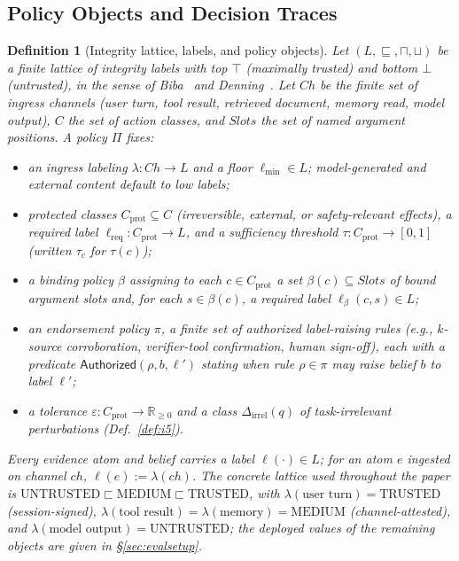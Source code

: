 \documentclass[conference,compsoc]{IEEEtran}
\newtheorem{definition}{Definition}
\theoremstyle{definition}
\theoremstyle{plain}
\providecommand{\tc}{\tau_{c}}
\newcommand{\bindpol}{\ensuremath{\beta}}
\newcommand{\lmin}{\ensuremath{\ell_{\min}}}
\newcommand{\lreq}{\ensuremath{\ell_{\mathrm{req}}}}
\newcommand{\Cprot}{\ensuremath{C_{\mathrm{prot}}}}
\newcommand{\Dirrel}{\ensuremath{\Delta_{\mathrm{irrel}}}}
\begin{document}
\subsection{Policy Objects and Decision Traces}
\label{sec:prelim}

\begin{definition}[Integrity lattice, labels, and policy objects]
\label{def:policy}
Let $(L, \sqsubseteq, \sqcap, \sqcup)$ be a finite lattice of integrity
labels with top $\top$ (maximally trusted) and bottom $\bot$
(untrusted), in the sense of Biba~\cite{biba} and
Denning~\cite{denning}. Let $\mathit{Ch}$ be the finite set of ingress
channels (user turn, tool result, retrieved document, memory read, model
output), $C$ the set of action classes, and $\mathit{Slots}$ the set of
named argument positions. A \emph{policy} $\Pi$ fixes:
\begin{itemize}[leftmargin=1.15em,itemsep=1pt]
\item an \emph{ingress labeling} $\lambda : \mathit{Ch} \to L$ and a
\emph{floor} $\lmin \in L$; model-generated and external content default
to low labels;
\item \emph{protected classes} $\Cprot \subseteq C$ (irreversible,
external, or safety-relevant effects), a \emph{required label}
$\lreq : \Cprot \to L$, and a \emph{sufficiency threshold}
$\tau : \Cprot \to [0,1]$ (written $\tc$ for $\tau(c)$);
\item a \emph{binding policy} $\bindpol$ assigning to each
$c \in \Cprot$ a set $\bindpol(c) \subseteq \mathit{Slots}$ of bound
argument slots and, for each $s \in \bindpol(c)$, a required label
$\ell_{\bindpol}(c, s) \in L$;
\item an \emph{endorsement policy} $\pi$, a finite set of authorized
label-raising rules (e.g., $k$-source corroboration, verifier-tool
confirmation, human sign-off), each with a predicate
$\mathsf{Authorized}(\rho, b, \ell')$ stating when rule $\rho \in \pi$
may raise belief $b$ to label $\ell'$;
\item a \emph{tolerance} $\varepsilon : \Cprot \to \mathbb{R}_{\ge 0}$
and a class $\Dirrel(q)$ of task-irrelevant perturbations
(Def.~\ref{def:i5}).
\end{itemize}
Every evidence atom and belief carries a label $\ell(\cdot) \in L$;
for an atom $e$ ingested on channel $\mathit{ch}$, $\ell(e) :=
\lambda(\mathit{ch})$. The concrete lattice used throughout the paper
is $\mathrm{UNTRUSTED} \sqsubset \mathrm{MEDIUM} \sqsubset
\mathrm{TRUSTED}$, with $\lambda(\text{user turn}) = \mathrm{TRUSTED}$
(session-signed), $\lambda(\text{tool result}) = \lambda(\text{memory})
= \mathrm{MEDIUM}$ (channel-attested), and $\lambda(\text{model
output}) = \mathrm{UNTRUSTED}$; the deployed values of the remaining
objects are given in \S\ref{sec:evalsetup}.
\end{definition}
\end{document}
